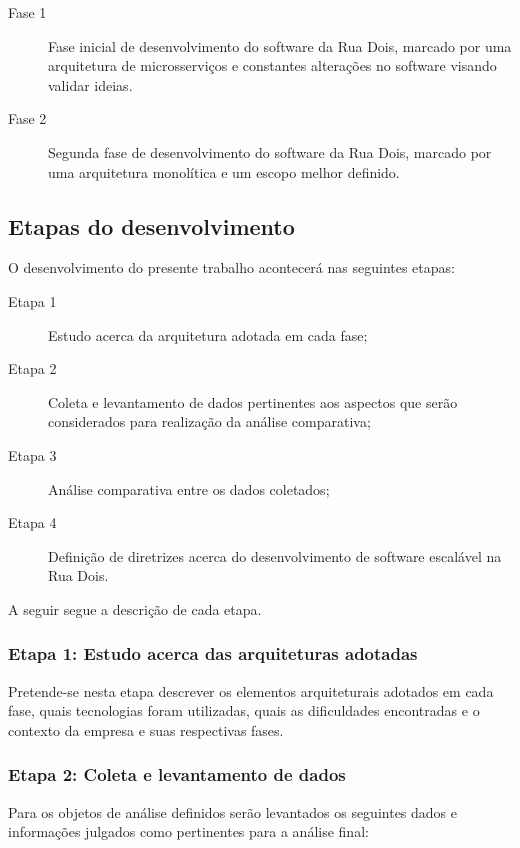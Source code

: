     \begin{description}
        \item [Fase 1] Fase inicial de desenvolvimento do software da Rua Dois,
        marcado por uma arquitetura de microsserviços e constantes alterações
        no software visando validar ideias.
        \item [Fase 2] Segunda fase de desenvolvimento do software da Rua Dois,
        marcado por uma arquitetura monolítica e um escopo melhor definido.
    \end{description}

\subsection{Etapas do desenvolvimento}

O desenvolvimento do presente trabalho acontecerá nas seguintes etapas:

    \begin{description}
        \item[Etapa 1] Estudo acerca da arquitetura adotada em cada fase;
        \item[Etapa 2] Coleta e levantamento de dados pertinentes aos aspectos que serão
        considerados para realização da análise comparativa;
        \item[Etapa 3] Análise comparativa entre os dados coletados;
        \item[Etapa 4] Definição de diretrizes acerca do desenvolvimento de software
        escalável na Rua Dois.
    \end{description}

A seguir segue a descrição de cada etapa.

\subsubsection{Etapa 1: Estudo acerca das arquiteturas adotadas}

Pretende-se nesta etapa descrever os elementos arquiteturais adotados em cada fase,
quais tecnologias foram utilizadas, quais as dificuldades encontradas e o contexto
da empresa e suas respectivas fases.

\subsubsection{Etapa 2: Coleta e levantamento de dados}

Para os objetos de análise definidos serão levantados os seguintes dados e informações
julgados como pertinentes para a análise final:

